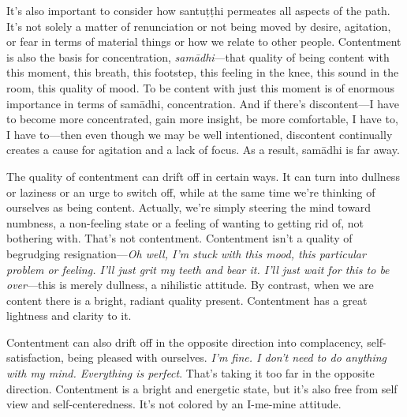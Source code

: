It's also important to consider how santuṭṭhi permeates all aspects 
of the path. It's not solely a matter of renunciation or not being 
moved by desire, agitation, or fear in terms of material things or how 
we relate to other people. Contentment is also the basis for 
concentration, \emph{samādhi}---that quality of being content with 
this moment, this breath, this footstep, this feeling in the knee, this 
sound in the room, this quality of mood. To be content with just this 
moment is of enormous importance in terms of samādhi, concentration. 
And if there's discontent---I have to become more concentrated, gain 
more insight, be more comfortable, I have to, I have to---then even 
though we may be well intentioned, discontent continually creates a 
cause for agitation and a lack of focus. As a result, samādhi is far 
away.

The quality of contentment can drift off in certain ways. It can turn 
into dullness or laziness or an urge to switch off, while at the same 
time we're thinking of ourselves as being content. Actually, we're 
simply steering the mind toward numbness, a non-feeling state or a 
feeling of wanting to getting rid of, not bothering with. That's not 
contentment. Contentment isn't a quality of begrudging 
resignation---\emph{Oh well, I'm stuck with this mood, this particular 
problem or feeling. I'll just grit my teeth and bear it. I'll just wait 
for this to be over}---this is merely dullness, a nihilistic attitude. 
By contrast, when we are content there is a bright, radiant quality 
present. Contentment has a great lightness and clarity to it.

Contentment can also drift off in the opposite direction into 
complacency, self-satisfaction, being pleased with ourselves. \emph{I'm 
fine. I don't need to do anything with my mind. Everything is perfect}. 
That's taking it too far in the opposite direction. Contentment is a 
bright and energetic state, but it's also free from self view and 
self-centeredness. It's not colored by an I-me-mine attitude.

